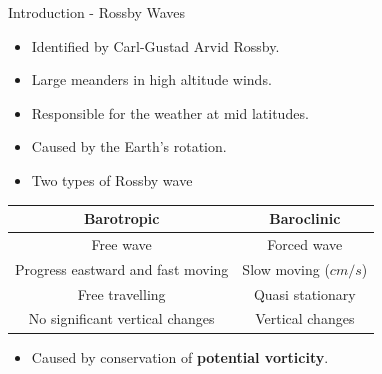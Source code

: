 \documentclass[12pt]{beamer}
\begin{document}
\begin{frame}{Introduction - Rossby Waves}

\begin{itemize}
\item Identified by Carl-Gustad Arvid Rossby.
\item Large meanders in high altitude winds.
\item Responsible for the weather at mid latitudes.
\item Caused by the Earth's rotation.
\item Two types of Rossby wave
\end{itemize}

\begin{table}[H]
\begin{center}
	\begin{tabular}{ |c|c|} 
		\hline
		\textbf{Barotropic} & \textbf{Baroclinic} \\
		\hline 
		Free wave & Forced wave \\  
		Progress eastward and fast moving & Slow moving ($cm/s$) \\
		Free travelling & Quasi stationary \\
		No significant vertical changes & Vertical changes \\
		\hline
	\end{tabular}
\end{center}
\end{table}

\begin{itemize}
\item Caused by conservation of \textbf{potential vorticity}.
\end{itemize}

\end{frame}
\end{document}
